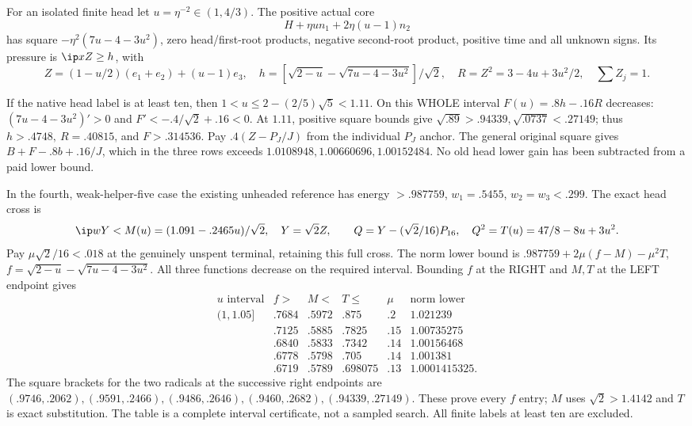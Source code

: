 For an isolated finite head let \(u=\eta^{-2}\in(1,4/3)\).
The positive actual core
\[
 H+\eta u n_1+2\eta(u-1)n_2
\]
has square \(-\eta^2(7u-4-3u^2)\), zero head/first-root products,
negative second-root product, positive time and all unknown signs.
Its pressure is \(\ip xZ\geq h\), with
\[
 Z=(1-u/2)(e_1+e_2)+(u-1)e_3,\quad
 h=[\sqrt{2-u}-\sqrt{7u-4-3u^2}]/\sqrt2,\quad
 R=Z^2=3-4u+3u^2/2,\quad \sum Z_j=1 .
\]

If the native head label is at least ten, then
\(1<u\leq2-(2/5)\sqrt5<1.11\).
On this WHOLE interval \(F(u)=.8h-.16R\) decreases:
\((7u-4-3u^2)'>0\) and
\(F'<-.4/\sqrt2+.16<0\).
At \(1.11\), positive square bounds give
\(\sqrt{.89}>.94339,\sqrt{.0737}<.27149\);
thus \(h>.4748,\ R=.40815\), and \(F>.314536\).
Pay \(.4(Z-P_J/J)\) from the individual \(P_J\) anchor.
The general original square gives \(B+F-.8b+.16/J\),
which in the three rows exceeds
\(1.0108948,1.00660696,1.00152484\).
No old head lower gain has been subtracted from a paid lower bound.

In the fourth, weak-helper-five case the existing unheaded reference
has energy \(>.987759\), \(w_1=.5455\), \(w_2=w_3<.299\).
The exact head cross is
\[
 \ip wY< M(u)=(1.091-.2465u)/\sqrt2,\quad Y=\sqrt2Z,\qquad
 Q=Y-(\sqrt2/16)P_{16},\quad
 Q^2=T(u)=47/8-8u+3u^2 .
\]
Pay \(\mu\sqrt2/16<.018\) at the genuinely unspent terminal,
retaining this full cross. The norm lower bound is
\(.987759+2\mu(f-M)-\mu^2T\), \(f=\sqrt{2-u}-\sqrt{7u-4-3u^2}\).
All three functions decrease on the required interval.
Bounding \(f\) at the RIGHT and \(M,T\) at the LEFT endpoint gives
\[
\begin{array}{c|c|c|c|c|c}
u\text{ interval}&f>&M<&T\leq&\mu&\text{norm lower}\\ \hline
(1,1.05]&.7684&.5972&.875&.2&1.021239\\
[1.05,1.08]&.7125&.5885&.7825&.15&1.00735275\\
[1.08,1.1]&.6840&.5833&.7342&.14&1.00156468\\
[1.1,1.105]&.6778&.5798&.705&.14&1.001381\\
[1.105,1.11]&.6719&.5789&.698075&.13&1.0001415325 .
\end{array}
\]
The square brackets for the two radicals at the successive right
endpoints are
\((.9746,.2062),(.9591,.2466),(.9486,.2646),
(.9460,.2682),(.94339,.27149)\).
These prove every \(f\) entry; \(M\) uses \(\sqrt2>1.4142\)
and \(T\) is exact substitution.
The table is a complete interval certificate, not a sampled search.
All finite labels at least ten are excluded.

